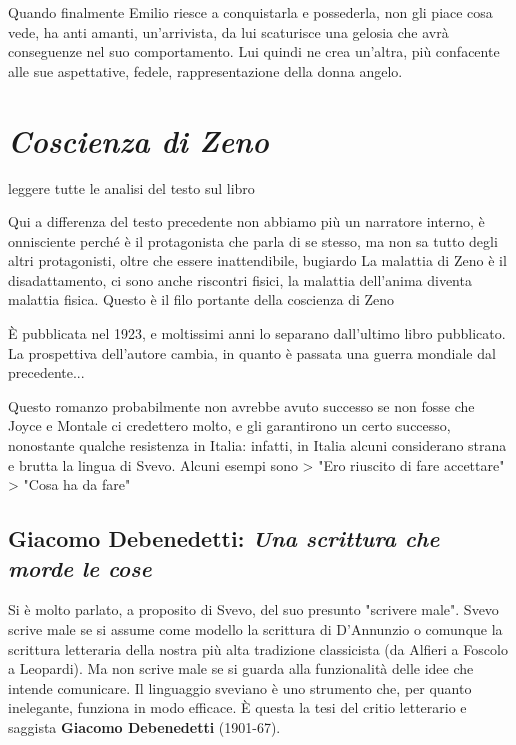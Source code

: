 
Quando finalmente Emilio riesce a conquistarla e possederla, non gli piace cosa vede, ha anti amanti, un’arrivista, da lui scaturisce una gelosia che avrà conseguenze nel suo comportamento. Lui quindi ne crea un’altra, più confacente alle sue aspettative, fedele, rappresentazione della donna angelo.


\chapter{\textit{Coscienza di Zeno}}

\item leggere tutte le analisi del testo sul libro

Qui a differenza del testo precedente non abbiamo più un narratore interno, è onnisciente perché è il protagonista che parla di se stesso, ma non sa tutto degli altri protagonisti, oltre che essere inattendibile, bugiardo
La malattia di Zeno è il disadattamento, ci sono anche riscontri fisici, la malattia dell’anima diventa malattia fisica. Questo è il filo portante della coscienza di Zeno

È pubblicata nel 1923, e moltissimi anni lo separano dall'ultimo libro pubblicato.
La prospettiva dell'autore cambia, in quanto è passata una guerra mondiale dal precedente...

Questo romanzo probabilmente non avrebbe avuto successo se non fosse che Joyce e Montale ci credettero molto, e gli garantirono un certo successo, nonostante qualche resistenza in Italia: infatti, in Italia alcuni considerano strana e brutta la lingua di Svevo. Alcuni esempi sono
> "Ero riuscito di fare accettare"
> "Cosa ha da fare"

\section{Giacomo Debenedetti: \textit{Una scrittura che morde le cose}}
Si è molto parlato, a proposito di Svevo, del suo presunto "scrivere male". Svevo scrive male se si assume come modello la scrittura di D'Annunzio o comunque la scrittura letteraria della nostra più alta tradizione classicista (da Alfieri a Foscolo a Leopardi). Ma non scrive male se si guarda alla funzionalità delle idee che intende comunicare. Il linguaggio sveviano è uno strumento che, per quanto inelegante, funziona in modo efficace. È questa la tesi del critio letterario e saggista \textbf{Giacomo Debenedetti} (1901-67).

